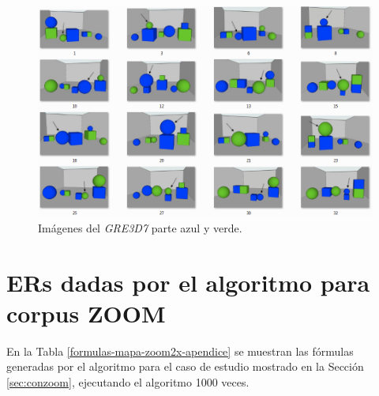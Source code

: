 \begin{figure}[h]
\centering
\includegraphics[width=1\textwidth]{images/corpusVerdeAzul.png}
\caption{Im\'agenes del \textit{GRE3D7} parte azul y verde.}
\label{verde-azul}
\end{figure}


\section{ERs dadas por el algoritmo para corpus ZOOM} \label{er-mapa-zoom}

En la Tabla \ref{formulas-mapa-zoom2x-apendice} se muestran las f\'ormulas generadas por el algoritmo para el caso de estudio mostrado en la Secci\'on \ref{sec:conzoom}, ejecutando el algoritmo 1000 veces.

